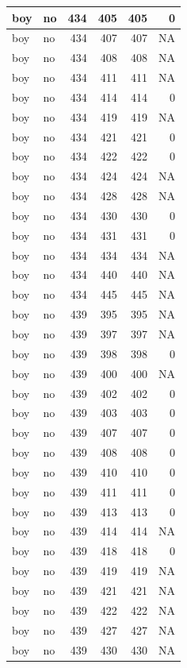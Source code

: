 \documentclass[man]{apa6}
\begin{document}
\begin{tabular}{l|l|r|r|r|r}
\hline
boy & no & 434 & 405 & 405 & 0\\
\hline
boy & no & 434 & 407 & 407 & NA\\
\hline
boy & no & 434 & 408 & 408 & NA\\
\hline
boy & no & 434 & 411 & 411 & NA\\
\hline
boy & no & 434 & 414 & 414 & 0\\
\hline
boy & no & 434 & 419 & 419 & NA\\
\hline
boy & no & 434 & 421 & 421 & 0\\
\hline
boy & no & 434 & 422 & 422 & 0\\
\hline
boy & no & 434 & 424 & 424 & NA\\
\hline
boy & no & 434 & 428 & 428 & NA\\
\hline
boy & no & 434 & 430 & 430 & 0\\
\hline
boy & no & 434 & 431 & 431 & 0\\
\hline
boy & no & 434 & 434 & 434 & NA\\
\hline
boy & no & 434 & 440 & 440 & NA\\
\hline
boy & no & 434 & 445 & 445 & NA\\
\hline
boy & no & 439 & 395 & 395 & NA\\
\hline
boy & no & 439 & 397 & 397 & NA\\
\hline
boy & no & 439 & 398 & 398 & 0\\
\hline
boy & no & 439 & 400 & 400 & NA\\
\hline
boy & no & 439 & 402 & 402 & 0\\
\hline
boy & no & 439 & 403 & 403 & 0\\
\hline
boy & no & 439 & 407 & 407 & 0\\
\hline
boy & no & 439 & 408 & 408 & 0\\
\hline
boy & no & 439 & 410 & 410 & 0\\
\hline
boy & no & 439 & 411 & 411 & 0\\
\hline
boy & no & 439 & 413 & 413 & 0\\
\hline
boy & no & 439 & 414 & 414 & NA\\
\hline
boy & no & 439 & 418 & 418 & 0\\
\hline
boy & no & 439 & 419 & 419 & NA\\
\hline
boy & no & 439 & 421 & 421 & NA\\
\hline
boy & no & 439 & 422 & 422 & NA\\
\hline
boy & no & 439 & 427 & 427 & NA\\
\hline
boy & no & 439 & 430 & 430 & NA\\

\end{tabular}
\end{document}
